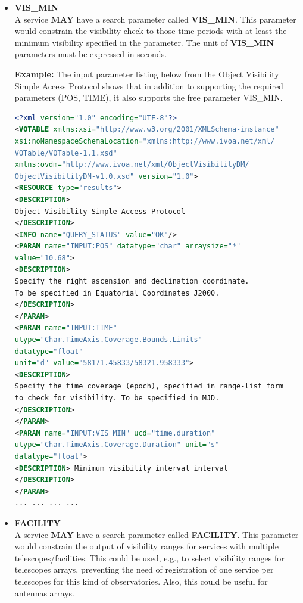 \documentclass[11pt,a4paper]{ivoatex/ivoa}
\begin{document}
\begin{itemize}
\item{\textbf{VIS\_MIN}\\A service \textbf{MAY} have a search parameter
called \textbf{VIS\_MIN}. This parameter would constrain the visibility
check to those time periods with at least the minimum visibility specified
in the parameter. The unit of \textbf{VIS\_MIN} parameters must be expressed
in seconds.\par
\textbf{Example:} The input parameter listing below from the Object
Visibility Simple Access Protocol shows that in addition to supporting
the required parameters (POS, TIME), it also supports the free
parameter VIS\_MIN.
\begin{lstlisting}[language=XML]
<?xml version="1.0" encoding="UTF-8"?>
<VOTABLE xmlns:xsi="http://www.w3.org/2001/XMLSchema-instance"
xsi:noNamespaceSchemaLocation="xmlns:http://www.ivoa.net/xml/
VOTable/VOTable-1.1.xsd"
xmlns:ovdm="http://www.ivoa.net/xml/ObjectVisibilityDM/
ObjectVisibilityDM-v1.0.xsd" version="1.0">
<RESOURCE type="results">
<DESCRIPTION>
Object Visibility Simple Access Protocol
</DESCRIPTION>
<INFO name="QUERY_STATUS" value="OK"/>
<PARAM name="INPUT:POS" datatype="char" arraysize="*"
value="10.68">
<DESCRIPTION>
Specify the right ascension and declination coordinate.
To be specified in Equatorial Coordinates J2000.
</DESCRIPTION>
</PARAM>
<PARAM name="INPUT:TIME"
utype="Char.TimeAxis.Coverage.Bounds.Limits"
datatype="float"
unit="d" value="58171.45833/58321.958333">
<DESCRIPTION>
Specify the time coverage (epoch), specified in range-list form
to check for visibility. To be specified in MJD.
</DESCRIPTION>
</PARAM>
<PARAM name="INPUT:VIS_MIN" ucd="time.duration"
utype="Char.TimeAxis.Coverage.Duration" unit="s"
datatype="float">
<DESCRIPTION> Minimum visibility interval interval
</DESCRIPTION>
</PARAM>
... ... ... ...
\end{lstlisting}

}
\item{\textbf{FACILITY}\\A service \textbf{MAY} have a search parameter
called \textbf{FACILITY}. This parameter would constrain the output of
visibility ranges for services with multiple telescopes/facilities.
This could be used, e.g., to select visibility ranges for telescopes
arrays, preventing the need of registration of one service per telescopes
for this kind of observatories. Also, this could be useful for antennas
arrays.}
\end{itemize}
\end{document}
